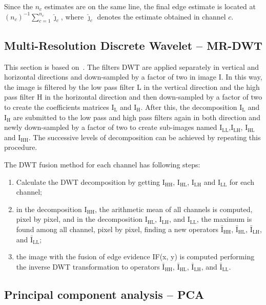 \documentclass[journal]{IEEEtran}
\begin{document}
Since the $n_c$ estimates are on the same line, the final edge estimate is located at
$(n_c)^{-1}\sum_{c=1}^{n_c} \widehat\jmath_c$,
where $\widehat\jmath_c$ denotes the estimate obtained in channel $c$.

\subsection{Multi-Resolution Discrete Wavelet -- MR-DWT} 
This section is based on~\cite{n_r}.
The filters DWT are applied separately in vertical and horizontal directions and down-sampled by a factor of two in image I. In this way, the image is filtered by the low pass filter L in the vertical direction and the high pass filter H in the horizontal direction and then down-sampled by a factor of two to create the coefficients matrices $\text{I}_\text{L}$ and $\text{I}_\text{H}$. After this, the decomposition $\text{I}_\text{L}$ and $\text{I}_\text{H}$ are submitted to the low pass and high pass filters again  in both direction and newly down-sampled by a factor of two to create sub-images named $\text{I}_\text{LL}$,$\text{I}_\text{LH}$, $\text{I}_\text{HL}$ and $\text{I}_\text{HH}$. The successive levels of decomposition can be achieved by repeating this procedure.

The DWT fusion method for each channel has following steps:
\begin{enumerate}
\item Calculate the DWT decomposition by getting $\text{I}_\text{HH}$, $\text{I}_\text{HL}$, $\text{I}_\text{LH}$ and $\text{I}_\text{LL}$ for each channel;
\item in the decomposition $\text{I}_\text{HH}$, the arithmetic mean of all channels is computed, pixel by pixel, and in the decomposition $\text{I}_\text{HL}$, $\text{I}_\text{LH}$, and $\text{I}_\text{LL}$, the maximum is found among all channel, pixel by pixel, finding a new operators $\bar{\text{I}}_\text{HH}$, $\bar{\text{I}}_\text{HL}$, $\bar{\text{I}}_\text{LH}$, and $\bar{\text{I}}_\text{LL}$;
\item the image with the fusion of edge evidence IF(x, y) is computed performing the inverse DWT transformation to operators $\bar{\text{I}}_\text{HH}$, $\bar{\text{I}}_\text{HL}$, $\bar{\text{I}}_\text{LH}$, and $\bar{\text{I}}_\text{LL}$.
\end{enumerate}


\subsection{Principal component analysis -- PCA}
\end{document}
